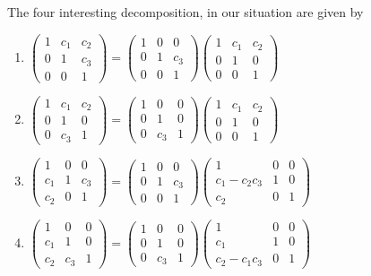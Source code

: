 The four interesting decomposition, in our situation are given by
\begin{enumerate}
  \item $\begin{pmatrix} 1 & c_1 & c_2 \\0 & 1 & c_3 \\0 & 0 & 1 \end{pmatrix}
    = \begin{pmatrix} 1 & 0 & 0 \\0 & 1 & c_3 \\0 & 0 & 1 \end{pmatrix}
    \begin{pmatrix} 1 & c_1 & c_2 \\0 & 1 & 0 \\0 & 0 & 1 \end{pmatrix}$
  \item $\begin{pmatrix} 1 & c_1 & c_2 \\0 & 1 & 0 \\0 & c_3 & 1 \end{pmatrix}
    = \begin{pmatrix} 1 & 0 & 0 \\0 & 1 & 0 \\0 & c_3 & 1 \end{pmatrix}
    \begin{pmatrix} 1 & c_1 & c_2 \\0 & 1 & 0 \\0 & 0 & 1 \end{pmatrix}$
  \item $\begin{pmatrix} 1 & 0 & 0 \\c_1 & 1 & c_3 \\c_2 & 0 & 1 \end{pmatrix}
    = \begin{pmatrix} 1 & 0 & 0 \\0 & 1 & c_3 \\0 & 0 & 1 \end{pmatrix}
    \begin{pmatrix} 1 & 0 & 0 \\c_1 -c_2c_3& 1 & 0 \\c_2 & 0 & 1 \end{pmatrix}$
  \item $\begin{pmatrix} 1 & 0 & 0 \\c_1 & 1 & 0 \\c_2 & c_3 & 1 \end{pmatrix}
    = \begin{pmatrix} 1 & 0 & 0 \\0 & 1 & 0 \\0 & c_3 & 1 \end{pmatrix}
    \begin{pmatrix} 1 & 0 & 0 \\c_1 & 1 & 0 \\c_2-c_1c_3 & 0 & 1 \end{pmatrix}$
\end{enumerate}
